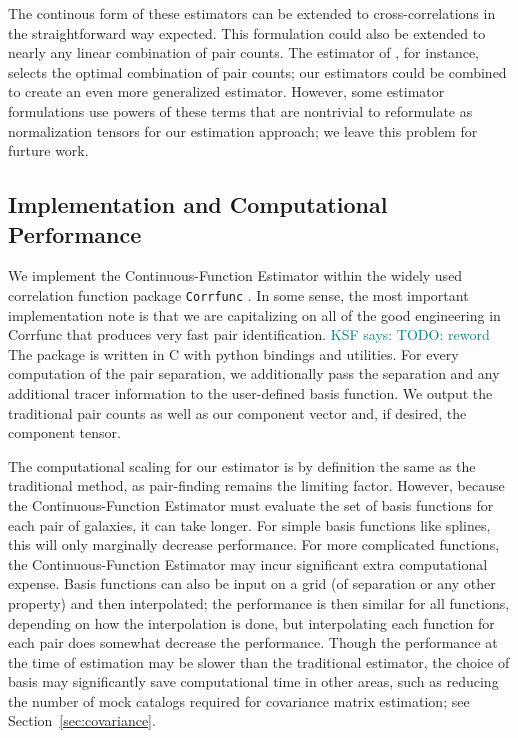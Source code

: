 \documentclass[modern]{aastex62}
\newcommand{\est}{the Continuous-Function Estimator\xspace}
\newcommand{\KSF}[1]{\textcolor{teal}{KSF says: #1}}
\begin{document}
The continous form of these estimators can be extended to cross-correlations in the straightforward way expected.
This formulation could also be extended to nearly any linear combination of pair counts.
The estimator of \cite{VargasMagana2013}, for instance, selects the optimal combination of pair counts; our estimators could be combined to create an even more generalized estimator.
However, some estimator formulations use powers of these terms that are nontrivial to reformulate as normalization tensors for our estimation approach; we leave this problem for furture work.


\subsection{Implementation and Computational Performance}
\label{sec:comp}

We implement \est within the widely used correlation function package \texttt{Corrfunc} \citep{Sinha2019}.
In some sense, the most important implementation note is that we are capitalizing on all of the good engineering in Corrfunc that produces very fast pair identification. \KSF{TODO: reword}
The package is written in C with python bindings and utilities.
For every computation of the pair separation, we additionally pass the separation and any additional tracer information to the user-defined basis function.
We output the traditional pair counts as well as our component vector and, if desired, the component tensor.

The computational scaling for our estimator is by definition the same as the traditional method, as pair-finding remains the limiting factor.
However, because \est must evaluate the set of basis functions for each pair of galaxies, it can take longer.
For simple basis functions like splines, this will only marginally decrease performance.
For more complicated functions, \est may incur significant extra computational expense.
Basis functions can also be input on a grid (of separation or any other property) and then interpolated; the performance is then similar for all functions, depending on how the interpolation is done, but interpolating each function for each pair does somewhat decrease the performance.
Though the performance at the time of estimation may be slower than the traditional estimator, the choice of basis may significantly save computational time in other areas, such as reducing the number of mock catalogs required for covariance matrix estimation; see Section~\ref{sec:covariance}.
\end{document}
